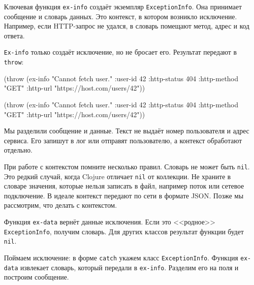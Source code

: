 Ключевая функция \verb|ex-info| создаёт экземпляр \verb|ExceptionInfo|. Она
принимает сообщение и словарь данных. Это контекст, в котором возникло
исключение. Например, если HTTP-запрос не удался, в словарь помещают метод,
адрес и код ответа.

\verb|Ex-info| только создаёт исключение, но не бросает его. Результат
передают в \verb|throw|:

\ifx\DEVICETYPE\MOBILE

\begin{english}
  \begin{clojure}
(throw (ex-info
        "Cannot fetch user."
        {:user-id 42
         :http-status 404
         :http-method "GET"
         :http-url
         "https://host.com/users/42"}))
  \end{clojure}
\end{english}

\else

\begin{english}
  \begin{clojure}
(throw (ex-info
        "Cannot fetch user."
        {:user-id 42
         :http-status 404
         :http-method "GET"
         :http-url "https://host.com/users/42"}))
  \end{clojure}
\end{english}

\fi

Мы разделили сообщение и данные. Текст не выдаёт номер пользователя и адрес
сервиса. Его запишут в лог или отправят пользователю, а контекст обработают
отдельно.

При работе с контекстом помните несколько правил. Словарь не может быть
\verb|nil|. Это редкий случай, когда Clojure отличает \verb|nil| от
коллекции. Не храните в словаре значения, которые нельзя записать в файл,
например поток или сетевое подключение. В идеале контекст передают по сети в
формате JSON. Позже мы рассмотрим, что делать с контекстом.

Функция \verb|ex-data| вернёт данные исключения. Если это <<родное>>
\verb|ExceptionInfo|, получим словарь. Для других классов результат функции
будет \verb|nil|.


Поймаем исключение: в форме \verb|catch| укажем класс
\verb|ExceptionInfo|. Функция \verb|ex-data| извлекает словарь, который передали
в \verb|ex-info|. Разделим его на поля и построим сообщение.

\ifx\DEVICETYPE\MOBILE

